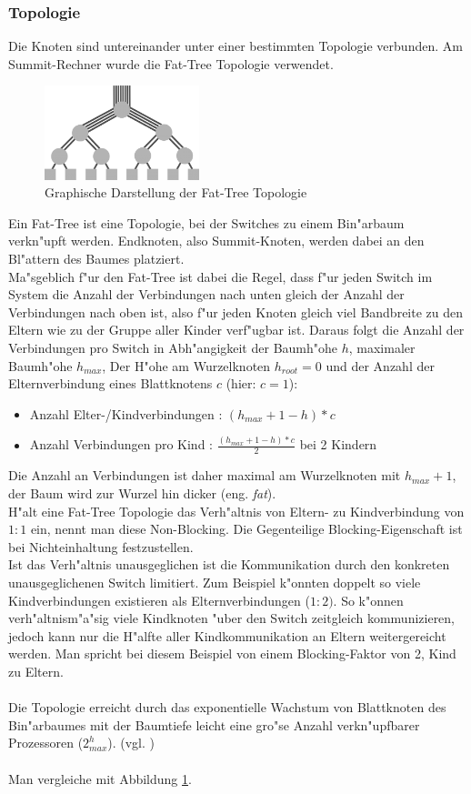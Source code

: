 \subsubsection{Topologie}
Die Knoten sind untereinander unter einer bestimmten Topologie verbunden. Am Summit-Rechner wurde die Fat-Tree Topologie verwendet.\\
\begin{figure}
\centering
\includegraphics[width=0.4\textwidth]{res/fat_tree.png}
\caption{\cite{fattree} Graphische Darstellung der Fat-Tree Topologie}
	\label{fig:fat_tree}
\end{figure}
Ein Fat-Tree ist eine Topologie, bei der Switches zu einem Bin"arbaum verkn"upft werden. Endknoten, also Summit-Knoten, werden dabei an den Bl"attern des Baumes platziert.\\
Ma"sgeblich f"ur den Fat-Tree ist dabei die Regel, dass f"ur jeden Switch im System die Anzahl der Verbindungen nach unten gleich der Anzahl der Verbindungen nach oben ist, also f"ur jeden Knoten gleich viel Bandbreite zu den Eltern wie zu der Gruppe aller Kinder verf"ugbar ist. Daraus folgt die Anzahl der Verbindungen pro Switch in Abh"angigkeit der Baumh"ohe $h$, maximaler Baumh"ohe $h_{max}$, Der H"ohe am Wurzelknoten $h_{root}=0$ und der Anzahl der Elternverbindung eines Blattknotens $c$ (hier: $c=1$):
\begin{itemize}
	\item Anzahl Elter-/Kindverbindungen : $(h_{max}+1-h)*c$
	\item Anzahl Verbindungen pro Kind : $\frac{(h_{max}+1-h)*c}{2}$ bei 2 Kindern
\end{itemize}
Die Anzahl an Verbindungen ist daher maximal am Wurzelknoten mit $h_{max}+1$, der Baum wird zur Wurzel hin \glqq dicker (eng. \textit{fat})\grqq.\\
H"alt eine Fat-Tree Topologie das Verh"altnis von Eltern- zu Kindverbindung von $1:1$ ein, nennt man diese Non-Blocking. Die Gegenteilige Blocking-Eigenschaft ist bei Nichteinhaltung festzustellen.\\
Ist das Verh"altnis unausgeglichen ist die Kommunikation durch den konkreten unausgeglichenen Switch limitiert. Zum Beispiel k"onnten doppelt so viele Kindverbindungen existieren als Elternverbindungen ($1:2)$. So k"onnen verh"altnism"a"sig viele Kindknoten "uber den Switch zeitgleich kommunizieren, jedoch kann nur die H"alfte aller Kindkommunikation an Eltern weitergereicht werden. Man spricht bei diesem Beispiel von einem Blocking-Faktor von 2, Kind zu Eltern.\\
\\
Die Topologie erreicht durch das exponentielle Wachstum von Blattknoten des Bin"arbaumes mit der Baumtiefe leicht eine gro"se Anzahl verkn"upfbarer Prozessoren ($2^h_{max}$). (vgl. \cite{fattree})\\
\\
Man vergleiche mit Abbildung \ref{fig:fat_tree}.

